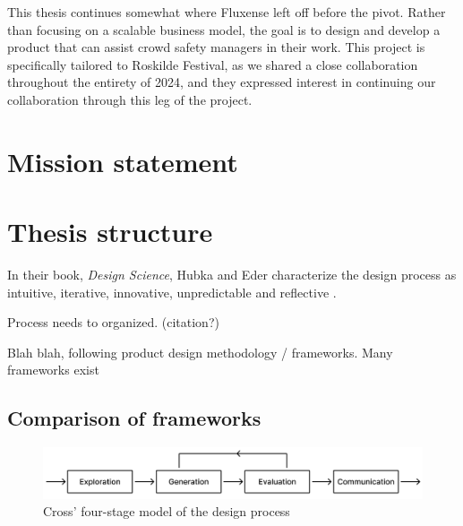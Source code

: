 This thesis continues somewhat where Fluxense left off before the pivot. Rather than focusing on a scalable business model, the goal is to design and develop a product that can assist crowd safety managers in their work. This project is specifically tailored to Roskilde Festival, as we shared a close collaboration throughout the entirety of 2024, and they expressed interest in continuing our collaboration through this leg of the project.

\section{Mission statement}

\section{Thesis structure}

In their book, \textit{Design Science}, Hubka and Eder characterize the design process as intuitive, iterative, innovative, unpredictable and reflective \cite{hubka_eder}.

Process needs to organized. (citation?)

Blah blah, following product design methodology / frameworks. Many frameworks exist

\subsection{Comparison of frameworks}
\vspace{2em}
\begin{figure}[H]
  \centering
  \includegraphics[width=14cm]{Pictures/Figures/cross.png}
  \caption{Cross' four-stage model of the design process}
  \label{fig:cross}
\end{figure}

